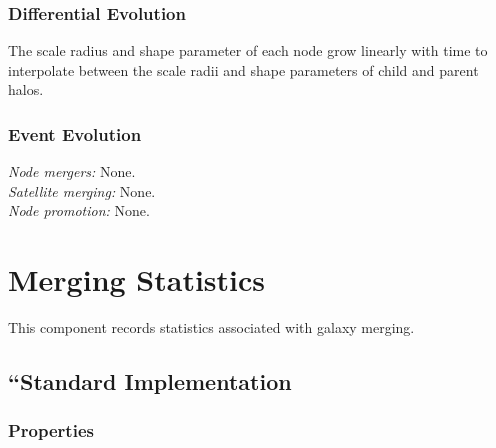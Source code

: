 \subsubsection{Differential Evolution}

The scale radius and shape parameter of each node grow linearly with time to interpolate between the scale radii and shape parameters of child and parent halos.

\subsubsection{Event Evolution}

\noindent\emph{Node mergers:} None.\\

\noindent\emph{Satellite merging:} None.\\

\noindent\emph{Node promotion:} None.\\


\section{Merging Statistics}

This \gls{component} records statistics associated with galaxy merging.

\subsection{``Standard Implementation}

\subsubsection{Properties}

